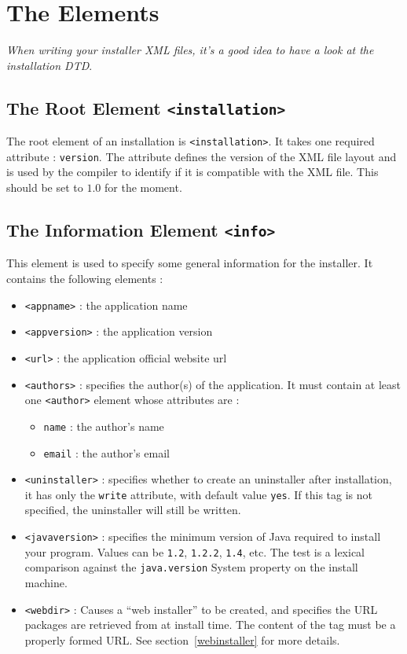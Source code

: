 \section{The \IzPack Elements}

\noindent
\textit{When writing your installer XML files, it's a good idea to have a look
at the \IzPack installation DTD}.\\

\subsection{The Root Element \texttt{<installation>}}
\label{root-element}

The root element of an installation is \texttt{<installation>}. It takes
one required attribute : \texttt{version}. The attribute defines the
version of the XML file layout and is used by the compiler to identify
if it is compatible with the XML file. This should be set to $1.0$ for
the moment.\\

\subsection{The Information Element \texttt{<info>}}
\label{info-element}

This element is used to specify some general information for the installer. It
contains the following elements :
\begin{itemize}

  \item \texttt{<appname>} : the application name
  \item \texttt{<appversion>} : the application version
  \item \texttt{<url>} : the application official website url
  \item \texttt{<authors>} : specifies the author(s) of the application. It must contain
  at least one \texttt{<author>} element whose attributes are :
  \begin{itemize}
    \item \texttt{name} : the author's name
    \item \texttt{email} : the author's email
  \end{itemize}
  \item \texttt{<uninstaller>} : specifies whether to create an uninstaller after installation, it has only the \texttt{write} attribute, with default value \texttt{yes}. If this tag is not specified, the uninstaller will still be written.
  \item \texttt{<javaversion>} : specifies the minimum version of Java required to install your program. Values can be \texttt{1.2}, \texttt{1.2.2}, \texttt{1.4}, etc. The test is a lexical comparison against the \texttt{java.version} System property on the install machine.
  \item \texttt{<webdir>} : Causes a ``web installer'' to be created, and specifies the URL packages are retrieved from at install time. The content of the tag must be a properly formed URL. See section~\ref{webinstaller} for more details.

\end{itemize}\


